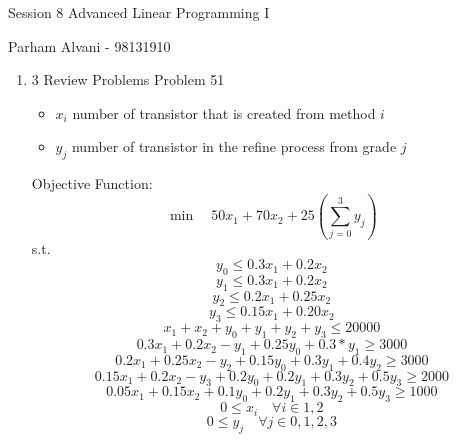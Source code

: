 \documentclass{article}
\begin{document}
\large %


{\Large Session 8 %
\hfill  Advanced Linear Programming I}

\begin{center}
{\Large Parham Alvani - 98131910} %
\end{center}
\vspace{0.05in}


\begin{enumerate}

\item 3 Review Problems Problem 51
\begin{itemize}
\item \(x_i\) number of transistor that is created from method \(i\)
\item \(y_j\) number of transistor in the refine process from grade \(j\)
\end{itemize}
\par
Objective Function:
\[
    \min\quad 50 x_1 + 70 x_2 + 25 (\sum_{j=0}^3y_j)
\]
s.t.
\[
    y_0 \le 0.3 x_1 + 0.2 x_2
\]
\[
    y_1 \le 0.3 x_1 + 0.2 x_2
\]
\[
    y_2 \le 0.2 x_1 + 0.25 x_2
\]
\[
    y_3 \le 0.15 x_1 + 0.20 x_2
\]
\[
    x_1 + x_2 + y_0 + y_1 + y_2 + y_3 \le 20000
\]
\[
    0.3 x_1 + 0.2 x_2 - y_1 + 0.25 y_0 + 0.3 * y_1 \ge 3000
\]
\[
    0.2 x_1 + 0.25 x_2 - y_2 + 0.15 y_0 + 0.3 y_1 + 0.4 y_2 \ge 3000
\]
\[
    0.15 x_1 + 0.2 x_2 - y_3 + 0.2 y_0 + 0.2 y_1 + 0.3 y_2 + 0.5 y_3 \ge 2000
\]
\[
    0.05 x_1 + 0.15 x_2 + 0.1 y_0 + 0.2 y_1 + 0.3 y_2 + 0.5 y_3 \ge 1000
\]
\[
    0 \le x_i \quad \forall i \in {1,2}
\]
\[
    0 \le y_j \quad \forall j \in {0,1,2,3}
\]

\end{enumerate}

\end{document}

